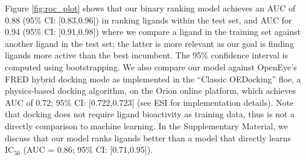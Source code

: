 



Figure \ref{fig:roc_plot} shows that our binary ranking model achieves an AUC of 0.88 (95\% CI: [0.83,0.96]) in ranking ligands within the test set, and AUC for 0.94 (95\% CI: [0.91,0.98]) where we compare a ligand in the training set against another ligand in the test set; the latter is more relevant as our goal is finding ligands more active than the best incumbent. The 95\% confidence interval is computed using bootstrapping. We also compare our model against OpenEye’s FRED hybrid docking mode as implemented in the ``Classic OEDocking'' floe, a physics-based docking algorithm, on the Orion online platform, which achieves AUC of 0.72; 95\% CI: [0.722,0.723] (see ESI for implementation details). Note that docking does not require ligand bioactivity as training data, thus is not a directly comparison to machine learning. In the Supplementary Material, we discuss that our model ranks ligands better than a model that directly learns $\mathrm{IC}_{50}$ (AUC = 0.86; 95\% CI: [0.71,0.95]). 

